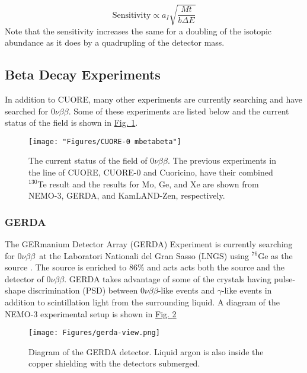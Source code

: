 \documentclass[12pt,a4paper]{article}
\newcommand{\zeronubb}{$0\nu \beta \beta$}
\begin{document}
\begin{equation}
\textrm{Sensitivity} \propto a_I \sqrt{\frac{Mt}{b\Delta E}}
\end{equation}
Note that the sensitivity increases the same for a doubling of the isotopic abundance as it does by a quadrupling of the detector mass.


\subsection{Beta Decay Experiments} \label{sec:zeronubb_Experiments}

In addition to CUORE, many other experiments are currently searching and have searched for \zeronubb. Some of these experiments are listed below and the current status of the field is shown in \hyperref[fig:cuore-0-mbetabeta]{Fig. \ref*{fig:cuore-0-mbetabeta}}.


\begin{figure}[htbp]
\centering
\texttt{[image: "Figures/CUORE-0 mbetabeta"]}
\caption{The current status of the field of \zeronubb. The previous experiments in the line of CUORE, CUORE-0 and Cuoricino, have their combined $^{130}$Te result and the results for Mo, Ge, and Xe are shown from NEMO-3, GERDA, and KamLAND-Zen, respectively.}
\label{fig:cuore-0-mbetabeta}
\end{figure}


\subsubsection*{GERDA}

The GERmanium Detector Array (GERDA) Experiment is currently searching for \zeronubb~at the Laboratori Nationali del Gran Sasso (LNGS) using $^{76}$Ge as the source \cite{Agostini:2016iid}. The source is enriched to $86\%$ and acts acts both the source and the detector of \zeronubb. GERDA takes advantage of some of the crystals having pulse-shape discrimination (PSD) between \zeronubb-like events and $\gamma$-like events in addition to scintillation light from the surrounding liquid. A diagram of the NEMO-3 experimental setup is shown in \hyperref[fig:gerda-labelled]{Fig. \ref*{fig:gerda-labelled}}

\begin{figure}[tbph]
\centering
\texttt{[image: Figures/gerda-view.png]}
\caption{Diagram of the GERDA detector. Liquid argon is also inside the copper shielding with the detectors submerged.}
\label{fig:gerda-labelled}
\end{figure}
\end{document}
